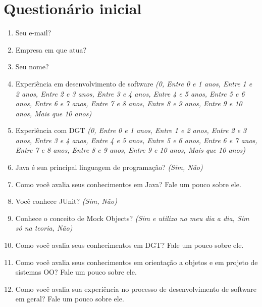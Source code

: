 \chapter{Questionário inicial}
\label{ape:questionario-inicio}

\begin{enumerate}

\item Seu e-mail?

\item Empresa em que atua?

\item Seu nome?

\item Experiência em desenvolvimento de software \textit{(0, Entre 0 e 1 anos, Entre 1 e 2 anos, Entre 2 e 3 anos, Entre 3 e 4 anos, Entre 4 e 5 anos, Entre 5 e 6 anos, Entre 6 e 7 anos, Entre 7 e 8 anos, Entre 8 e 9 anos, Entre 9 e 10 anos, Mais que 10 anos)}

\item Experiência com DGT \textit{(0, Entre 0 e 1 anos, Entre 1 e 2 anos, Entre 2 e 3 anos, Entre 3 e 4 anos, Entre 4 e 5 anos, Entre 5 e 6 anos, Entre 6 e 7 anos, Entre 7 e 8 anos, Entre 8 e 9 anos, Entre 9 e 10 anos, Mais que 10 anos)}

\item Java é sua principal linguagem de programação? \textit{(Sim, Não)}

\item Como você avalia seus conhecimentos em Java? Fale um pouco sobre ele.	

\item Você conhece JUnit? \textit{(Sim, Não)}

\item Conhece o conceito de Mock Objects? \textit{(Sim e utilizo no meu dia a dia, Sim só na teoria, Não)}

\item Como você avalia seus conhecimentos em DGT? Fale um pouco sobre ele.	

\item Como você avalia seus conhecimentos em orientação a objetos e em projeto de sistemas OO? Fale um pouco sobre ele.	

\item Como você avalia sua experiência no processo de desenvolvimento de software em geral? Fale um pouco sobre ele.	

\end{enumerate}